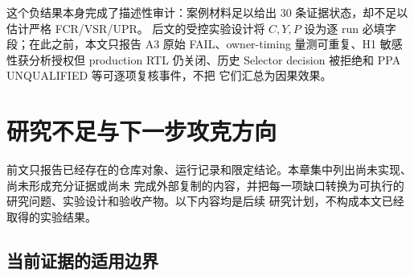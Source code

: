 \documentclass[UTF8,a4paper,zihao=-4,oneside]{ctexart}
\begin{document}
这个负结果本身完成了描述性审计：案例材料足以给出 30 条证据状态，却不足以估计严格 FCR/VSR/UPR。
后文的受控实验设计将 $C,Y,P$ 设为逐 run 必填字段；在此之前，本文只报告 A3 原始 FAIL、owner-timing
量测可重复、H1 敏感性获分析授权但 production RTL 仍关闭、历史 Selector decision 被拒绝和 PPA
UNQUALIFIED 等可逐项复核事件，不把
它们汇总为因果效果。

\section{研究不足与下一步攻克方向}
\label{sec:limitations-roadmap}

前文只报告已经存在的仓库对象、运行记录和限定结论。本章集中列出尚未实现、尚未形成充分证据或尚未
完成外部复制的内容，并把每一项缺口转换为可执行的研究问题、实验设计和验收产物。以下内容均是后续
研究计划，不构成本文已经取得的实验结果。

\subsection{当前证据的适用边界}
\end{document}
